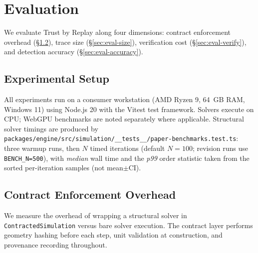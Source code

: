 \documentclass[letterpaper,twocolumn,10pt]{article}
\begin{document}

\section{Evaluation}
\label{sec:eval}

We evaluate Trust by Replay along four dimensions: contract enforcement
overhead (\S\ref{sec:eval-overhead}), trace size (\S\ref{sec:eval-size}),
verification cost (\S\ref{sec:eval-verify}), and detection accuracy
(\S\ref{sec:eval-accuracy}).

\subsection{Experimental Setup}

All experiments run on a consumer workstation (AMD Ryzen 9, 64~GB RAM,
Windows 11) using Node.js 20 with the Vitest test framework. Solvers execute
on CPU; WebGPU benchmarks are noted separately where applicable. Structural
solver timings are produced by \texttt{packages/engine/src/simulation/\_\_tests\_\_/paper-benchmarks.test.ts}:
three warmup runs, then $N$ timed iterations (default $N{=}100$; revision runs
use \texttt{BENCH\_N=500}), with \emph{median} wall time and the \emph{p99}
order statistic taken from the sorted per-iteration samples (not mean$\pm$CI).

\subsection{Contract Enforcement Overhead}
\label{sec:eval-overhead}

We measure the overhead of wrapping a structural solver in
\texttt{ContractedSimulation} versus bare solver execution. The contract
layer performs geometry hashing before each step, unit validation at
construction, and provenance recording throughout.
\end{document}
